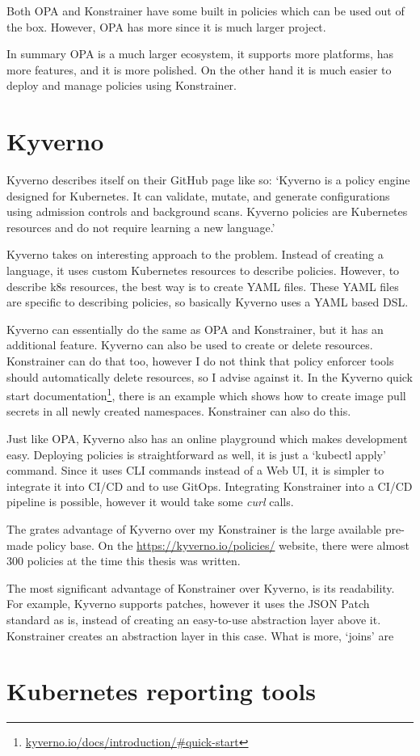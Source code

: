 Both OPA and Konstrainer have some built in policies which can be used out of the box. However, OPA has more since it is much larger project.

In summary OPA is a much larger ecosystem, it supports more platforms, has more features, and it is more polished. On the other hand it is much easier to deploy and manage policies using Konstrainer.

\section{Kyverno}

Kyverno describes itself on their GitHub page like so:
`Kyverno is a policy engine designed for Kubernetes. It can validate, mutate, and generate configurations using admission controls and background scans. Kyverno policies are Kubernetes resources and do not require learning a new language.' \cite{Kyverno}

Kyverno takes on interesting approach to the problem. Instead of creating a language, it uses custom Kubernetes resources to describe policies. However, to describe k8s resources, the best way is to create YAML files. These YAML files are specific to describing policies, so basically Kyverno uses a YAML based DSL.

Kyverno can essentially do the same as OPA and Konstrainer, but it has an additional feature. Kyverno can also be used to create or delete resources. Konstrainer can do that too, however I do not think that policy enforcer tools should automatically delete resources, so I advise against it. In the Kyverno quick start documentation\footnote{\url{kyverno.io/docs/introduction/\#quick-start}}, there is an example which shows how to create image pull secrets in all newly created namespaces. Konstrainer can also do this.

Just like OPA, Kyverno also has an online playground which makes development easy. Deploying policies is straightforward as well, it is just a `kubectl apply' command. Since it uses CLI commands instead of a Web UI, it is simpler to integrate it into CI/CD and to use GitOps. Integrating Konstrainer into a CI/CD pipeline is possible, however it would take some \emph{curl} calls.

The grates advantage of Kyverno over my Konstrainer is the large available pre-made policy base. On the \url{https://kyverno.io/policies/} website, there were almost 300 policies at the time this thesis was written.

The most significant advantage of Konstrainer over Kyverno, is its readability. For example, Kyverno supports patches, however it uses the JSON Patch standard as is, instead of creating an easy-to-use abstraction layer above it. Konstrainer creates an abstraction layer in this case. What is more, `joins' are 

\section{Kubernetes reporting tools}




